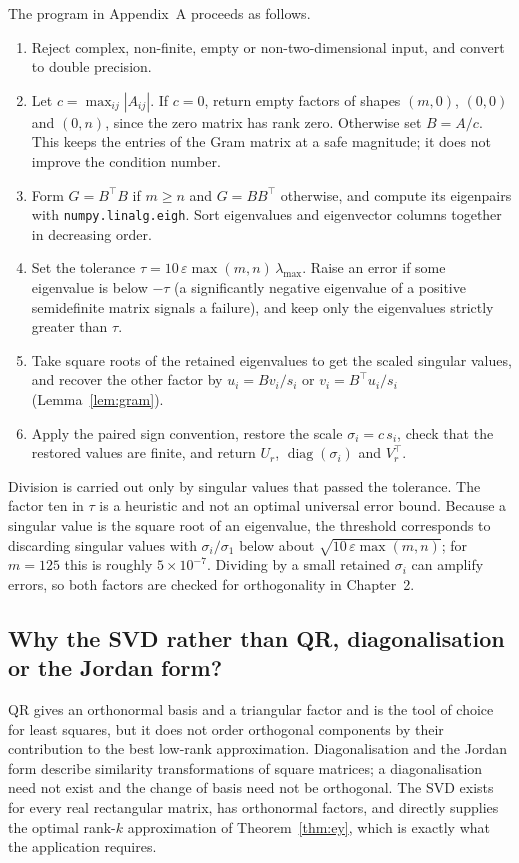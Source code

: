 \documentclass[12pt,a4paper]{report}
\newcommand{\T}{^{\top}}
\DeclareMathOperator{\diag}{diag}
\theoremstyle{plain}
\theoremstyle{definition}
\theoremstyle{remark}
\theoremstyle{definition}
\begin{document}
The program in Appendix~A proceeds as follows.
\begin{enumerate}
\item Reject complex, non-finite, empty or non-two-dimensional input, and convert to double precision.
\item Let $c=\max_{ij}|A_{ij}|$. If $c=0$, return empty factors of shapes $(m,0)$, $(0,0)$ and $(0,n)$, since the zero matrix has rank zero. Otherwise set $B=A/c$. This keeps the entries of the Gram matrix at a safe magnitude; it does not improve the condition number.
\item Form $G=B\T B$ if $m\ge n$ and $G=BB\T$ otherwise, and compute its eigenpairs with \texttt{numpy.linalg.eigh}. Sort eigenvalues and eigenvector columns together in decreasing order.
\item Set the tolerance $\tau=10\,\varepsilon\max(m,n)\,\lambda_{\max}$. Raise an error if some eigenvalue is below $-\tau$ (a significantly negative eigenvalue of a positive semidefinite matrix signals a failure), and keep only the eigenvalues strictly greater than $\tau$.
\item Take square roots of the retained eigenvalues to get the scaled singular values, and recover the other factor by $u_i=Bv_i/s_i$ or $v_i=B\T u_i/s_i$ (Lemma~\ref{lem:gram}).
\item Apply the paired sign convention, restore the scale $\sigma_i=c\,s_i$, check that the restored values are finite, and return $U_r$, $\diag(\sigma_i)$ and $V_r\T$.
\end{enumerate}
Division is carried out only by singular values that passed the tolerance. The factor ten in $\tau$ is a heuristic and not an optimal universal error bound. Because a singular value is the square root of an eigenvalue, the threshold corresponds to discarding singular values with $\sigma_i/\sigma_1$ below about $\sqrt{10\,\varepsilon\max(m,n)}$; for $m=125$ this is roughly $5\times10^{-7}$. Dividing by a small retained $\sigma_i$ can amplify errors, so both factors are checked for orthogonality in Chapter~2.

\subsection{Why the SVD rather than QR, diagonalisation or the Jordan form?}

QR gives an orthonormal basis and a triangular factor and is the tool of choice for least squares, but it does not order orthogonal components by their contribution to the best low-rank approximation. Diagonalisation and the Jordan form describe similarity transformations of square matrices; a diagonalisation need not exist and the change of basis need not be orthogonal. The SVD exists for every real rectangular matrix, has orthonormal factors, and directly supplies the optimal rank-$k$ approximation of Theorem~\ref{thm:ey}, which is exactly what the application requires.
\end{document}
